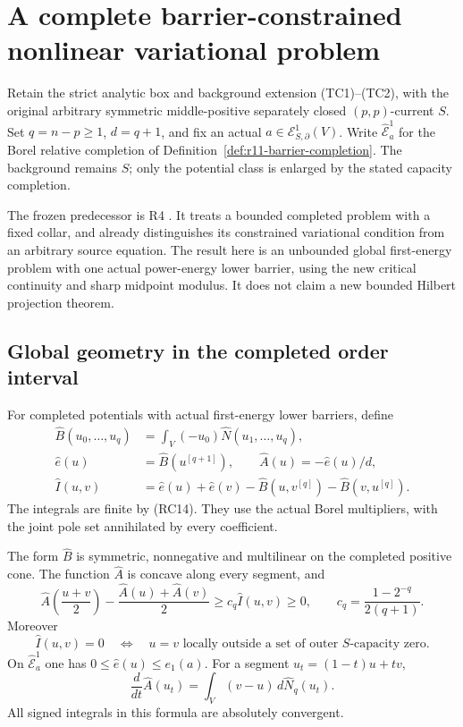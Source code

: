 \section{A complete barrier-constrained nonlinear variational problem}
\label{sec:r11-completed-barrier-variational}

Retain the strict analytic box and background extension
(TC1)--(TC2), with the original arbitrary symmetric
middle-positive separately closed $(p,p)$-current $S$.
Set $q=n-p\geq1$, $d=q+1$, and fix an actual
$a\in\mathcal E^1_{S,\partial}(V)$.
Write $\widehat{\mathcal E}^1_a$ for the Borel relative
completion of Definition~\ref{def:r11-barrier-completion}.
The background remains $S$; only the potential class
is enlarged by the stated capacity completion.

The frozen predecessor is R4
.
It treats a bounded completed problem with a fixed
collar, and already distinguishes its constrained
variational condition from an arbitrary source equation.
The result here is an unbounded global first-energy
problem with one actual power-energy lower barrier,
using the new critical continuity and sharp midpoint
modulus.  It does not claim a new bounded Hilbert
projection theorem.

\subsection{Global geometry in the completed order interval}

For completed potentials with actual first-energy
lower barriers, define
\[
\begin{split}
 \widehat B(u_0,\ldots,u_q)
    &=\int_V(-u_0)\widehat N(u_1,\ldots,u_q),\\
 \widehat e(u)&=\widehat B(u^{[q+1]}),\qquad
 \widehat A(u)=-\widehat e(u)/d,\\
 \widehat I(u,v)
    &=\widehat e(u)+\widehat e(v)
       -\widehat B(u,v^{[q]})-\widehat B(v,u^{[q]}).
\end{split}
 \tag{BV1}
\]
The integrals are finite by (RC14).  They use the
actual Borel multipliers, with the joint pole set
annihilated by every coefficient.

\begin{lemma}
\label{lem:r11-completed-first-energy-geometry}
The form $\widehat B$ is symmetric, nonnegative and
multilinear on the completed positive cone.
The function $\widehat A$ is concave along every
segment, and
\[
 \widehat A\left(\frac{u+v}{2}\right)
      -\frac{\widehat A(u)+\widehat A(v)}2
                    \geq c_q\widehat I(u,v)\geq0,
 \qquad c_q=\frac{1-2^{-q}}{2(q+1)}.
 \tag{BV2}
\]
Moreover
\[
 \widehat I(u,v)=0
       \quad\Longleftrightarrow\quad
 u=v\text{ locally outside a set of outer }S
                         \text{-capacity zero}.
 \tag{BV3}
\]
On $\widehat{\mathcal E}^1_a$ one has
$0\leq\widehat e(u)\leq e_1(a)$.
For a segment $u_t=(1-t)u+tv$,
\[
             \frac{d}{dt}\widehat A(u_t)
                    =\int_V(v-u)\,d\widehat N_q(u_t).
 \tag{BV4}
\]
All signed integrals in this formula are absolutely
convergent.
\end{lemma}

